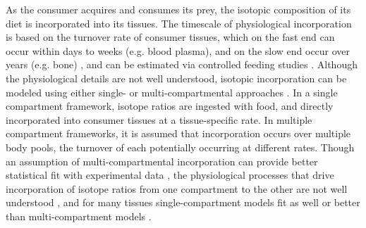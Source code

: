 \documentclass{frontiersSCNS}
\begin{document}
As the consumer acquires and consumes its prey, the isotopic composition of its diet is incorporated into its tissues.
The timescale of physiological incorporation is based on the turnover rate of consumer tissues, which on the fast end can occur within days to weeks (e.g. blood plasma), and on the slow end occur over years (e.g. bone) \citep{Tieszen:1983ij}, and can be estimated via controlled feeding studies \citep{Kurle:2009ch,Bearhop:2010db,Kim:2012kc}. %
Although the physiological details are not well understood, isotopic incorporation can be modeled using either single- or multi-compartmental approaches \citep{Cerling:2006kv,delRio:2008bs}.
In a single compartment framework, isotope ratios are ingested with food, and directly incorporated into consumer tissues at a tissue-specific rate.
In multiple compartment frameworks, it is assumed that incorporation occurs over multiple body pools, the turnover of each potentially occurring at different rates.
Though an assumption of multi-compartmental incorporation can provide better statistical fit with experimental data \citep{Cerling:2006kv,Kurle:2009ch,Carleton:2008cq}, the physiological processes that drive incorporation of isotope ratios from one compartment to the other are not well understood \citep{delRio:2008bs}, and for many tissues single-compartment models fit as well or better than multi-compartment models \citep{Kurle:2009ch}.
\end{document}
